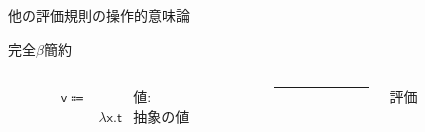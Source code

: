 \documentclass[9pt]{beamer}
\begin{document}
\begin{frame}{他の評価規則の操作的意味論}
\begin{block}{完全$\beta$簡約}
\begin{columns}
    \begin{column}{0.48\textwidth}
        \begin{align*}
        \mathsf{v}\Coloneq& &\text{値:}\\
            &\lambda \mathsf{x}.\mathsf{t}&\text{抽象の値}&
        \end{align*}
    \end{column}
    \begin{column}{.02\textwidth}
        \rule{.1mm}{0.5\textheight}
    \end{column}
    \begin{column}{0.48\textwidth}
        評価
        \begin{prooftree}
        \end{prooftree}
        \begin{prooftree}
        \end{prooftree}
        \begin{prooftree}
        \end{prooftree}
        \begin{prooftree}
        \end{prooftree}

    \end{column}
\end{columns}
\end{block}
\end{frame}
\end{document}
